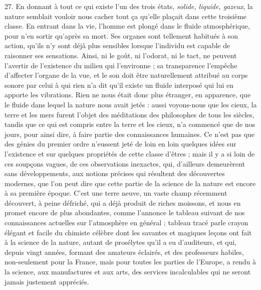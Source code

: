 \documentclass[a4paper, 11pt, oneside, polutonikogreek, french]{article}
\begin{document}
27. En donnant à tout ce qui existe l'un des trois états, \emph{solide, liquide, gazeux}, la nature semblait vouloir nous cacher tout ça qu'elle plaçait dans cette troisième classe. En entrant dans la vie, l'homme est plongé dans le fluide atmosphérique, pour n'en sortir qu'après sa mort. Ses organes sont tellement habitués à son action, qu'ils n'y sont déjà plus sensibles lorsque l'individu est capable de raisonner ses sensations. Ainsi, ni le goût, ni l'odorat, ni le tact, ne peuvent l'avertir de l'existence du milieu qui l'environne ; sa transparence l'empêche d'affecter l'organe de la vue, et le son doit être naturellement attribué au corps sonore par celui à qui rien n'a dit qu'il existe un fluide interposé qui lui en apporte les vibrations. Rien ne nous était donc plus étranger, en apparence, que le fluide dans lequel la nature nous avait jetés : aussi voyons-nous que les cieux, la terre et les mers furent l'objet des méditations des philosophes de tous les siècles, tandis que ce qui est compris entre la terre et les cieux, n'a commencé que de nos jours, pour ainsi dire, à faire partie des connaissances humaines. Ce n'est pas que des génies du premier ordre n'eussent jeté de loin en loin quelques idées sur l'existence et sur quelques propriétés de cette classe d'êtres ; mais il y a si loin de ces soupçons vagues, de ces observations inexactes, qui, d'ailleurs demeurèrent sans développements, aux notions précises qui résultent des découvertes modernes, que l'on peut dire que cette partie de la science de la nature est encore à sa première époque. C'est une terre neuve, un vaste champ récemment découvert, à peine défriché, qui a déjà produit de riches moissons, et nous en promet encore de plus abondantes, comme l'annonce le tableau suivant de nos connaissances actuelles sur l'atmosphère en général ; tableau tracé parle crayon élégant et facile du chimiste célèbre dont les savantes et magiques leçons ont fait à la science de la nature, autant de prosélytes qu'il a eu d'auditeurs, et qui, depuis vingt années, formant des amateurs éclairés, et des professeurs habiles, non-seulement pour la France, mais pour toutes les parties de l'Europe, a rendu à la science, aux manufactures et aux arts, des services incalculables qui ne seront jamais justement appréciés.
\end{document}
